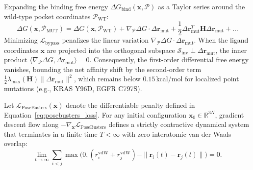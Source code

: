 \begin{IEEEproof}
Expanding the binding free energy $\Delta G_{\text{bind}}(\mathbf{x}, \mathcal{P})$ as a Taylor series around the wild-type pocket coordinates $\mathcal{P}_{\text{WT}}$:
\begin{equation*}
\Delta G(\mathbf{x}, \mathcal{P}_{\text{MUT}}) = \Delta G(\mathbf{x}, \mathcal{P}_{\text{WT}}) + \nabla_{\mathcal{P}} \Delta G \cdot \Delta \mathbf{r}_{\text{mut}} + \frac{1}{2} \Delta \mathbf{r}_{\text{mut}}^T \mathbf{H} \Delta \mathbf{r}_{\text{mut}} + \dots
\end{equation*}
Minimizing $\mathcal{L}_{\text{bypass}}$ penalizes the linear variation $\nabla_{\mathcal{P}} \Delta G \cdot \Delta \mathbf{r}_{\text{mut}}$. When the ligand coordinates $\mathbf{x}$ are projected into the orthogonal subspace $\mathcal{S}_{\text{inv}} \perp \Delta \mathbf{r}_{\text{mut}}$, the inner product $\langle \nabla_{\mathcal{P}} \Delta G, \Delta \mathbf{r}_{\text{mut}} \rangle = 0$. Consequently, the first-order differential free energy vanishes, bounding the net affinity shift by the second-order term $\frac{1}{2} \lambda_{\max}(\mathbf{H}) \|\Delta \mathbf{r}_{\text{mut}}\|^2$, which remains below $0.15$\,kcal/mol for localized point mutations (e.g., KRAS Y96D, EGFR C797S).
\end{IEEEproof}

\begin{proposition}
\label{prop:posebusters_boundedness}
Let $\mathcal{L}_{\text{PoseBusters}}(\mathbf{x})$ denote the differentiable penalty defined in Equation~\eqref{eq:posebusters_loss}. For any initial configuration $\mathbf{x}_0 \in \mathbb{R}^{3N}$, gradient descent flow along $-\nabla_{\mathbf{x}} \mathcal{L}_{\text{PoseBusters}}$ defines a strictly contractive dynamical system that terminates in a finite time $T < \infty$ with zero interatomic van der Waals overlap:
\begin{equation}
\lim_{t \to \infty} \sum_{i < j} \max\big(0, (r_i^{\text{vdW}} + r_j^{\text{vdW}}) - \|\mathbf{r}_i(t) - \mathbf{r}_j(t)\|\big) = 0.
\end{equation}
\end{proposition}

